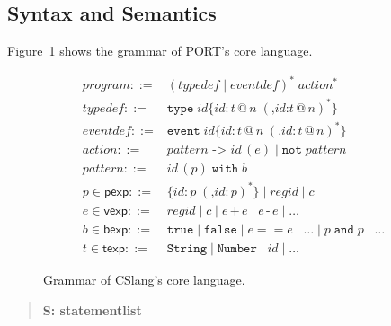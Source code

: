 \fi


\subsection{Syntax and Semantics}
\label{sub:SyntaxAndSemantics}

Figure~\ref{lst:SyntaxGrammar} shows the grammar of PORT's core language.

\begin{figure}[t]
\centering
\begin{align*}
\mathit{program} ::= {} &  (\mathit{typedef} \mid \mathit{eventdef})^* \; \mathit{action}^*\\
\mathit{typedef} ::= {} & \mathtt{type}\; \mathit{id} \texttt{\{}\mathit{id} \texttt{:}\, t\, \texttt{@}\, n \; (\texttt{,} \mathit{id}\texttt{:} t\,\texttt{@}\,n)^*\texttt{\}}\\
\mathit{eventdef} ::= {} & \mathtt{event}\; \mathit{id} \texttt{\{}\mathit{id}\texttt{:}\, t\,\texttt{@}\,n \; (\texttt{,} \mathit{id}\texttt{:}\, t\,\texttt{@}\,n)^*\texttt{\}}\\
\mathit{action} ::= {} & \mathit{pattern} \texttt{ -> } \mathit{id}\,(e) \mid \mathtt{not} \; \mathit{pattern}\\
\mathit{pattern} ::= {} & \mathit{id}\,(p) \;\mathtt{with}\; b\\
p \in \mathsf{pexp} ::= {} & \texttt{\{} \mathit{id}\texttt{:}\, p \; (\texttt{,} \mathit{id}\texttt{:}\, p)^*\texttt{\}} \mid \mathit{regid} \mid c \\
e \in \mathsf{vexp} ::= {} & \mathit{regid} \mid c \mid e \,\texttt{+}\, e \mid e \,\texttt{-}\, e \mid \dots\\
b \in \mathsf{bexp} ::= {} & \mathtt{true} \mid \mathtt{false} \mid e == e \mid \ldots \mid p \;\mathtt{and}\; p \mid \dots\\
t \in \mathsf{texp} ::= {} & \mathtt{String} \mid \mathtt{Number} \mid \mathit{id} \mid \dots
\end{align*}
\caption{Grammar of CSlang's core language.}
\label{lst:SyntaxGrammar}
\end{figure}


\begin{quote}
\centering
\textbf{S: statementlist}
\end{quote}

